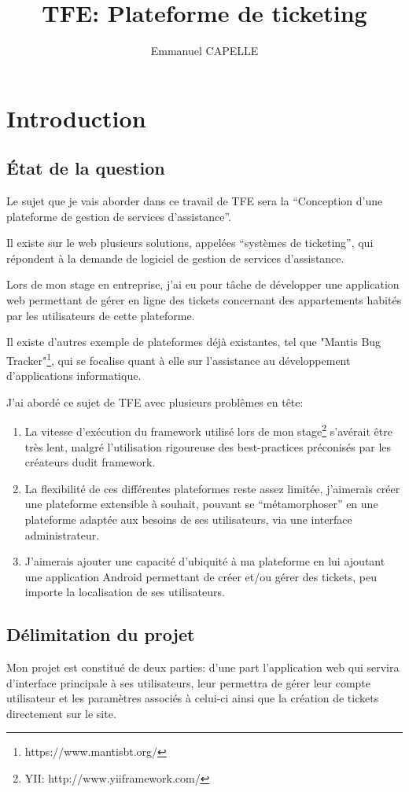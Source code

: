 \documentclass[12pt,table,a4paper]{report}
\title{TFE: Plateforme de ticketing}
\author{Emmanuel CAPELLE}
\date{}
\begin{document}
\tableofcontents

\newpage

\chapter{Introduction}

\section{État de la question}
Le sujet que je vais aborder dans ce travail de TFE sera la “Conception d’une plateforme de gestion de services d’assistance”.

Il existe sur le web plusieurs solutions, appelées “systèmes de ticketing”, qui répondent à la demande de logiciel de gestion de services d’assistance.

Lors de mon stage en entreprise, j’ai eu pour tâche de développer une application web permettant de gérer en ligne des tickets concernant des appartements habités par les utilisateurs de cette plateforme.

Il existe d’autres exemple de plateformes déjà existantes, tel que "Mantis Bug Tracker"\footnote{https://www.mantisbt.org/}, qui se focalise quant à elle sur l’assistance au développement d’applications informatique.

J’ai abordé ce sujet de TFE avec plusieurs problêmes en tête:
\begin{enumerate}
\item{La vitesse d’exécution du framework utilisé lors de mon stage\footnote{YII: http://www.yiiframework.com/} s’avérait être très lent, malgré l’utilisation rigoureuse des best-practices préconisés par les créateurs dudit framework.}
\item{La flexibilité de ces différentes plateformes reste assez limitée, j’aimerais créer une plateforme extensible à souhait, pouvant se "`métamorphoser"' en une plateforme adaptée aux besoins de ses utilisateurs, via une interface administrateur.}
\item{J’aimerais ajouter une capacité d’ubiquité à ma plateforme en lui ajoutant une application Android permettant de créer et/ou gérer des tickets, peu importe la localisation de ses utilisateurs.}
\end{enumerate}


\section{Délimitation du projet}
Mon projet est constitué de deux parties: d'une part l'application web qui servira d'interface principale à ses utilisateurs, leur permettra de gérer leur compte utilisateur et les paramètres associés à celui-ci ainsi que la création de tickets directement sur le site.
\end{document}
